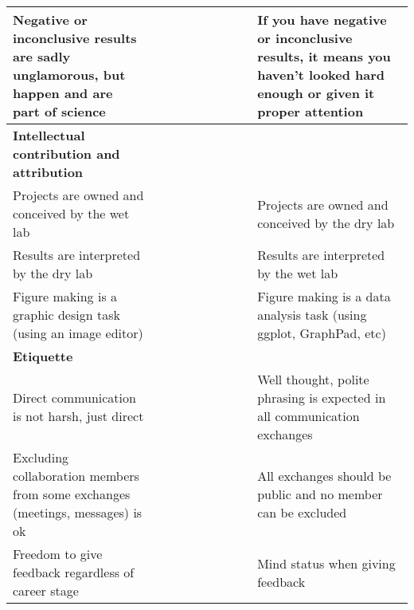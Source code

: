 \begin{table}[!ht]
\begin{adjustbox}{max width=\textwidth}
\begin{tabular}{|p{3.1in}|l|l|l|l|l|p{3.1in}|}
        Negative or inconclusive results are sadly unglamorous, but happen and are part of science & ~ & ~ & ~ & ~ & ~ & If you have negative or inconclusive results, it means you haven't looked hard enough or given it proper attention \\ \hline
        \textbf{Intellectual contribution and attribution} & ~ & ~ & ~ & ~ & ~ & ~ \\ \hline
        Projects are owned and conceived by the wet lab & ~ & ~ & ~ & ~ & ~ & Projects are owned and conceived by the dry lab \\ \hline
        Results are interpreted by the dry lab & ~ & ~ & ~ & ~ & ~ & Results are interpreted by the wet lab \\ \hline
        Figure making is a graphic design task (using an image editor) & ~ & ~ & ~ & ~ & ~ & Figure making is a data analysis task (using ggplot, GraphPad, etc) \\ \hline
        \textbf{Etiquette} & ~ & ~ & ~ & ~ & ~ & ~ \\ \hline
        Direct communication is not harsh, just direct & ~ & ~ & ~ & ~ & ~ & Well thought, polite phrasing is expected in all communication exchanges \\ \hline
        Excluding collaboration members from some exchanges (meetings, messages) is ok & ~ & ~ & ~ & ~ & ~ & All exchanges should be public and no member can be excluded \\ \hline
        Freedom to give feedback regardless of career stage & ~ & ~ & ~ & ~ & ~ & Mind status when giving feedback \\ \hline
    \end{tabular}

    \end{adjustbox}
\end{table}